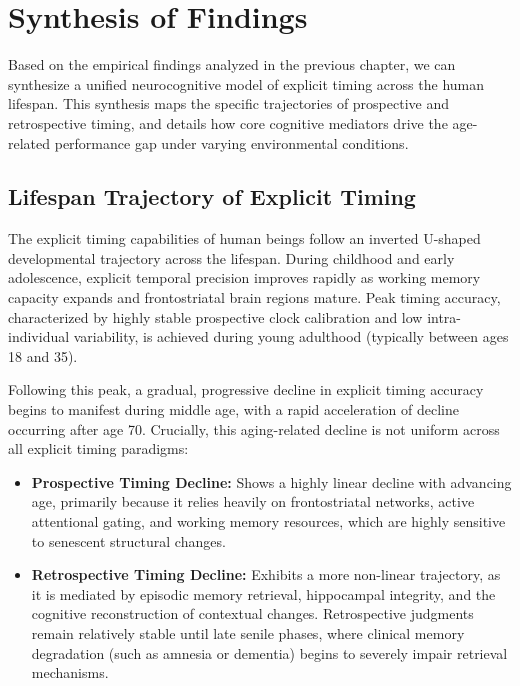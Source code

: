 \documentclass{custom_report}
\begin{document}
\newpage

\chapter{Synthesis of Findings}
\label{ch:synthesis}

Based on the empirical findings analyzed in the previous chapter, we can synthesize a unified neurocognitive model of explicit timing across the human lifespan. This synthesis maps the specific trajectories of prospective and retrospective timing, and details how core cognitive mediators drive the age-related performance gap under varying environmental conditions.

\section{Lifespan Trajectory of Explicit Timing}
The explicit timing capabilities of human beings follow an inverted U-shaped developmental trajectory across the lifespan. During childhood and early adolescence, explicit temporal precision improves rapidly as working memory capacity expands and frontostriatal brain regions mature. Peak timing accuracy, characterized by highly stable prospective clock calibration and low intra-individual variability, is achieved during young adulthood (typically between ages 18 and 35).

Following this peak, a gradual, progressive decline in explicit timing accuracy begins to manifest during middle age, with a rapid acceleration of decline occurring after age 70. Crucially, this aging-related decline is not uniform across all explicit timing paradigms:
\begin{itemize}
    \item \textbf{Prospective Timing Decline:} Shows a highly linear decline with advancing age, primarily because it relies heavily on frontostriatal networks, active attentional gating, and working memory resources, which are highly sensitive to senescent structural changes.
    \item \textbf{Retrospective Timing Decline:} Exhibits a more non-linear trajectory, as it is mediated by episodic memory retrieval, hippocampal integrity, and the cognitive reconstruction of contextual changes. Retrospective judgments remain relatively stable until late senile phases, where clinical memory degradation (such as amnesia or dementia) begins to severely impair retrieval mechanisms.
\end{itemize}
\end{document}
